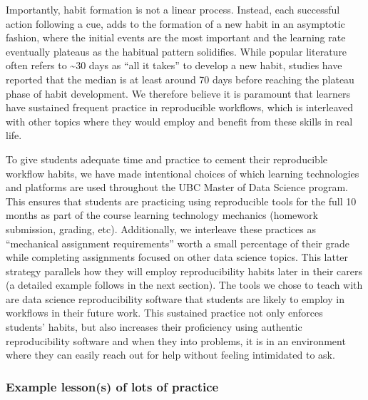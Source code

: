 \documentclass[
  12 pt,
]{paper}
\begin{document}
Importantly,
habit formation is not a linear process.
Instead,
each successful action following a cue,
adds to the formation of a new habit in an asymptotic fashion,
where the initial events are the most important
and the learning rate eventually plateaus as the habitual pattern solidifies.
While popular literature often refers to \textasciitilde30 days as ``all it takes''
to develop a new habit,
studies have reported that the median is at least around 70 days \autocite{wardle_lally_2010,radel_fournier_2017}
before reaching the plateau phase of habit development.
We therefore believe it is paramount
that learners have sustained frequent practice in reproducible workflows,
which is interleaved with other topics
where they would employ and benefit from these skills in real life.

To give students adequate time and practice to cement their reproducible workflow habits,
we have made intentional choices of which learning technologies and platforms
are used throughout the UBC Master of Data Science program.
This ensures that students are practicing using reproducible tools
for the full 10 months as part of the course learning technology mechanics
(homework submission, grading, etc).
Additionally, we interleave these practices as
``mechanical assignment requirements'' worth a small percentage of their
grade while completing assignments focused on other data science topics.
This latter strategy parallels how they will employ reproducibility
habits later in their carers
(a detailed example follows in the next section).
The tools we chose to teach with are data science reproducibility software
that students are likely to employ in workflows in their future work.
This sustained practice not only enforces students' habits,
but also increases their proficiency using authentic reproducibility software
and when they into problems, it is in an environment
where they can easily reach out for help without feeling intimidated to ask.

\hypertarget{example-lessons-of-lots-of-practice}{%
\subsubsection{Example lesson(s) of lots of practice}\label{example-lessons-of-lots-of-practice}}
\end{document}
